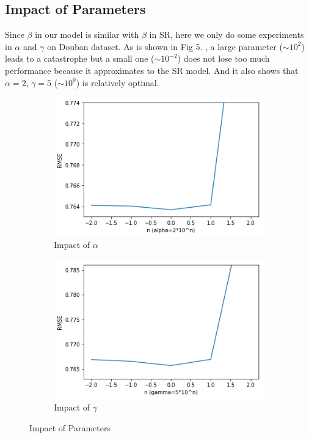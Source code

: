 \documentclass{article}
\begin{document}
\subsection{Impact of Parameters}
Since $\beta$ in our model is similar with $\beta$ in SR, here we 
only do some experiments in $\alpha$ and $\gamma$ on Douban dataset. 
As is shown in Fig 5. , a large parameter ($\sim 10^2$) 
leads to a catastrophe but a small one ($\sim 10^{-2}$) does not lose too much performance 
because it approximates to the SR model. 
And it also shows that $\alpha=2$, $\gamma=5$ ($\sim 10^{0}$) is relatively optimal.
\begin{figure}[h]    
  \centering
  \begin{subfigure}{0.4\textwidth}
    \centering
      \includegraphics[width=1\linewidth]{pic/figure5_1.png}
    \caption{Impact of $\alpha$}
  \end{subfigure}%
  \begin{subfigure}{0.4\textwidth}
  \centering
      \includegraphics[width=1\linewidth]{pic/figure5_2.png}
    \caption{Impact of $\gamma$}
  \end{subfigure}%
\caption{Impact of Parameters}
\end{figure}
\end{document}
